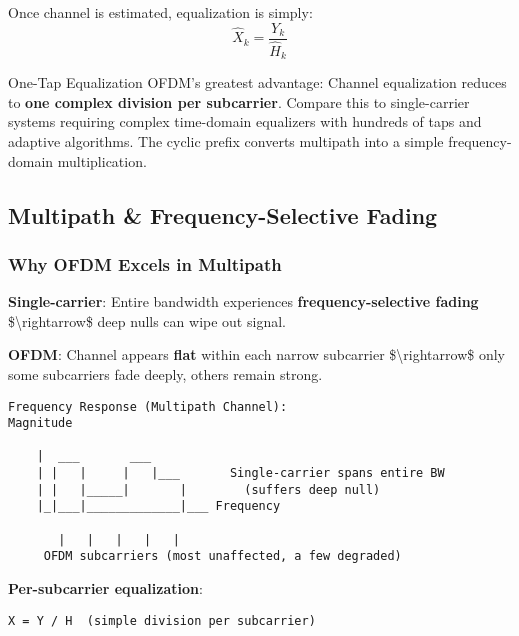 Once channel is estimated, equalization is simply:
\begin{equation}
\hat{X}_k = \frac{Y_k}{\hat{H}_k}
\end{equation}

\begin{calloutbox}{One-Tap Equalization}
OFDM's greatest advantage: Channel equalization reduces to \textbf{one complex division per subcarrier}. Compare this to single-carrier systems requiring complex time-domain equalizers with hundreds of taps and adaptive algorithms. The cyclic prefix converts multipath into a simple frequency-domain multiplication.
\end{calloutbox}

\subsection{\texorpdfstring{ Multipath \& Frequency-Selective
Fading}{ Multipath \& Frequency-Selective Fading}}\label{multipath-frequency-selective-fading}

\subsubsection{Why OFDM Excels in
Multipath}\label{why-ofdm-excels-in-multipath}

\textbf{Single-carrier}: Entire bandwidth experiences
\textbf{frequency-selective fading} \$\textbackslash rightarrow\$ deep
nulls can wipe out signal.

\textbf{OFDM}: Channel appears \textbf{flat} within each narrow
subcarrier \$\textbackslash rightarrow\$ only some subcarriers fade
deeply, others remain strong.

\begin{verbatim}
Frequency Response (Multipath Channel):
Magnitude
    
    |  ___       ___
    | |   |     |   |___       Single-carrier spans entire BW
    | |   |_____|       |        (suffers deep null)
    |_|___|_____________|___ Frequency
                   
       |   |   |   |   |
     OFDM subcarriers (most unaffected, a few degraded)
\end{verbatim}

\textbf{Per-subcarrier equalization}:

\begin{verbatim}
X = Y / H  (simple division per subcarrier)
\end{verbatim}

